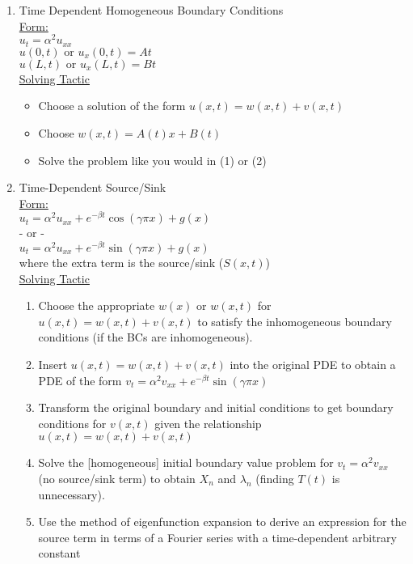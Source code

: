 \documentclass{article}
\begin{document}
\begin{enumerate}
    \item Time Dependent Homogeneous Boundary Conditions
    \medskip\\
    \underline{Form:}
    \medskip\\
    $u_t = \alpha^2 u_{xx}$
    \smallskip\\
    $u(0,t) \textrm{ or } u_x(0,t) = At$\\
    $u(L,t) \textrm{ or } u_x(L,t) = Bt$
    \medskip\\
    \underline{Solving Tactic}
    \begin{itemize}
        \item Choose a solution of the form $u(x,t) = w(x,t) + v(x,t)$
        \item Choose $w(x,t) = A(t)x + B(t)$
        \item Solve the problem like you would in (1) or (2)
    \end{itemize}
\pagebreak
    \item Time-Dependent Source/Sink
    \medskip\\
    \underline{Form:}
    \medskip\\
    $u_t = \alpha^2 u_{xx} + e^{-\beta t}\cos(\gamma\pi x) + g(x)$\\
     - or -\\
    $u_t = \alpha^2 u_{xx} + e^{-\beta t}\sin(\gamma\pi x) + g(x)$
    \medskip\\
    where the extra term is the source/sink ($S(x,t)$)
    \medskip\\
    \underline{Solving Tactic}
    \begin{enumerate}
        \item Choose the appropriate $w(x)$ or $w(x,t)$ for $u(x,t) = w(x,t) + v(x,t)$ to satisfy the inhomogeneous boundary conditions (if the BCs are inhomogeneous).
        \item Insert $u(x,t) = w(x,t) + v(x,t)$ into the original PDE to obtain a PDE of the form $v_t = \alpha^2 v_{xx} + e^{-\beta t}\sin(\gamma\pi x)$
        \item Transform the original boundary and initial conditions to get boundary conditions for $v(x,t)$ given the relationship $u(x,t) = w(x,t) + v(x,t)$
        \item Solve the [homogeneous] initial boundary value problem for $v_t = \alpha^2 v_{xx}$ (no source/sink term) to obtain $X_n$ and $\lambda_n$ (finding $T(t)$ is unnecessary).
        \item Use the method of eigenfunction expansion to derive an expression for the source term in terms of a Fourier series with a time-dependent arbitrary constant

\end{enumerate}
\end{enumerate}
\end{document}

